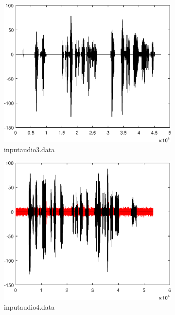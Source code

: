 \documentclass[10pt,twocolumn]{article}
\begin{document}
{\begin{figure}[ht]
  \begin{subfigure}{0.45\linewidth}
    \centering
    \includegraphics[scale=0.3]{images/res3.eps}
    \caption{inputaudio3.data}
  \end{subfigure}
  \begin{subfigure}{0.45\linewidth}
    \centering
    \includegraphics[scale=0.3]{images/res4.eps}
    \caption{inputaudio4.data}
  \end{subfigure}
  \par\medskip
  \begin{subfigure}{0.45\linewidth}

\end{subfigure}
\end{figure}}
\end{document}
